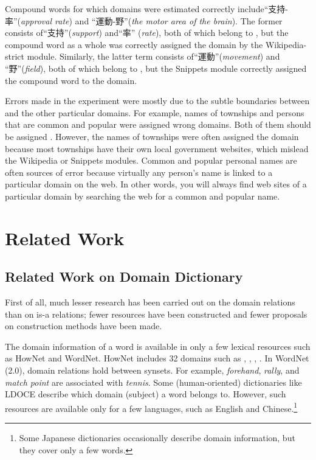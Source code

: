 \documentclass[english]{jnlp_1.4_rep}
\newcommand{\dom}[1]{}
\begin{document}
Compound words for which domains were estimated correctly
include“支持-率”(\textit{approval rate}) and 
“運動-野”(\textit{the motor area of the brain}).
The former consists of“支持”(\textit{support}) and“率”
(\textit{rate}), both
of which belong to \dom{nodomain}, but the compound word as a whole
was correctly assigned the \dom{government} domain by the
Wikipedia-strict module.
Similarly, the latter term consists of“運動”(\textit{movement}) and
“野”(\textit{field}), both of which belong to \dom{nodomain}, but
the Snippets module correctly assigned the compound word 
to the \dom{health} domain.

Errors made in the experiment were mostly due to
the subtle boundaries between
\dom{nodomain} and the other particular domains.
For example, 
names of townships and persons that are common and popular were
assigned wrong domains.
Both of them should be assigned \dom{nodomain}.
However, the names of townships were often assigned the \dom{government}
domain because
most townships have their own local government websites,
which mislead the Wikipedia or Snippets modules.
Common and popular personal names are often sources of error because
virtually any person's name is linked to a particular domain on the web.
In other words, you will always find web sites of a
particular domain by searching the web for a common and popular
name.


\section{Related Work}
\label{sec:related-work}

\subsection{Related Work on Domain Dictionary}
\label{sec:related-work-on-domain-dictionary}

First of all, much lesser research has been carried out on the domain
relations than on is-a relations;
fewer resources have been constructed and fewer proposals on construction
methods have been made.

The domain information of a word is available in only a few lexical
resources such as HowNet \cite{HowNet:Dong:Dong:2006} and
WordNet. 
HowNet includes 32 domains such as \dom{economy}, \dom{industry},
\dom{agriculture}, \dom{education}.
In WordNet (2.0), domain relations hold between synsets.
For example, \textit{forehand}, \textit{rally}, and
\textit{match point} are associated with \textit{tennis}.
Some (human-oriented) dictionaries like LDOCE \cite{LDOCE:1987} describe
which domain (subject) a word belongs to. 
However, such resources are available only for a few languages,
such as English and Chinese.\footnote{
Some Japanese dictionaries occasionally describe domain
information,
but they cover only a few words.}
\end{document}
